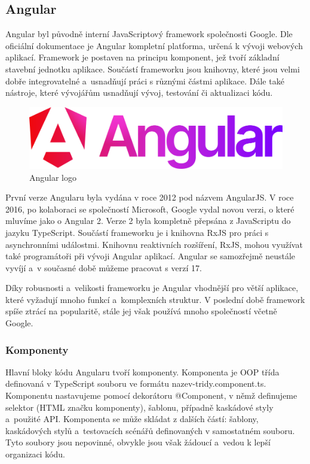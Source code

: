 \subsection{Angular}

Angular byl původně interní JavaScriptový framework společnosti Google. 
Dle oficiální dokumentace \cite{angulario} je Angular kompletní platforma, určená k vývoji webových aplikací. 
Framework je postaven na principu komponent, jež tvoří základní stavební jednotku aplikace. 
Součástí frameworku jsou knihovny, které jsou velmi dobře integrovatelné a~usnadňují práci s různými částmi aplikace. 
Dále také nástroje, které vývojářům usnadňují vývoj, testování či aktualizaci kódu.\cite{angulario,learningangular}

\begin{figure}[htb]
	\centering
		\includegraphics[width=.5\textwidth]{images/angular-logo.png}
	\caption[Angular logo]{Angular logo \cite{angulardev}}
	\label{fig:angularlogo}
\end{figure}

První verze Angularu byla vydána v roce 2012 pod názvem AngularJS. 
V roce 2016, po kolaboraci se společností Microsoft, Google vydal novou verzi, o které mluvíme jako o Angular 2. 
Verze 2 byla kompletně přepsána z JavaScriptu do jazyku TypeScript. 
Součástí frameworku je i knihovna RxJS pro práci s asynchronními událostmi. 
Knihovnu reaktivních rozšíření, RxJS, mohou využívat také programátoři při vývoji Angular aplikací. 
Angular se samozřejmě neustále vyvíjí a~v současné době můžeme pracovat s verzí 17.\cite{angulardev,learningangular}

Díky robusnosti a~velikosti frameworku je Angular vhodnější pro větší aplikace, které vyžadují mnoho funkcí a~komplexních struktur. 
V poslední době framework spíše ztrácí na popularitě, stále jej však používá mnoho společností včetně Google.\cite{learningangular}

\subsubsection{Komponenty}

Hlavní bloky kódu Angularu tvoří komponenty. Komponenta je OOP třída definovaná v TypeScript souboru ve formátu nazev-tridy.component.ts. 
Komponentu nastavujeme pomocí dekorátoru @Component, v němž definujeme selektor (HTML značku komponenty), šablonu, případně kaskádové styly a~použité API. 
Komponenta se může skládat z dalších částí: šablony, kaskádových stylů a~testovacích scénářů definovaných v samostatném souboru. 
Tyto soubory jsou nepovinné, obvykle jsou však žádoucí a~vedou k lepší organizaci kódu. 

